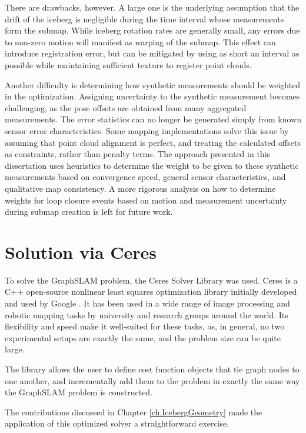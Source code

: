 There are drawbacks, however. A large one is the underlying assumption that the drift of the iceberg is negligible during the time interval whose measurements form the submap. While iceberg rotation rates are generally small, any errors due to non-zero motion will manifest as warping of the submap. This effect can introduce registration error, but can be mitigated by using as short an interval as possible while maintaining sufficient texture to register point clouds.

Another difficulty is determining how synthetic measurements should be weighted in the optimization. Assigning uncertainty to the synthetic measurement becomes challenging, as the pose offsets are obtained from many aggregated measurements. The error statistics can no longer be generated simply from known sensor error characteristics. Some mapping implementations solve this issue by assuming that point cloud alignment is perfect, and treating the calculated offsets as constraints, rather than penalty terms. The approach presented in this dissertation uses heuristics to determine the weight to be given to these synthetic measurements based on convergence speed, general sensor characteristics, and qualitative map consistency. A more rigorous analysis on how to determine weights for loop closure events based on motion and measurement uncertainty during submap creation is left for future work.

\section{Solution via Ceres}

To solve the GraphSLAM problem, the Ceres Solver Library was used. Ceres is a C++ open-source nonlinear least squares optimization library initially developed and used by Google \cite{ceres-solver}. It has been used in a wide range of image processing and robotic mapping tasks by university and research groups around the world. Its flexibility and speed make it well-suited for these tasks, as, in general, no two experimental setups are exactly the same, and the problem size can be quite large.  

The library allows the user to define cost function objects that tie graph nodes to one another, and incrementally add them to the problem in exactly the same way the GraphSLAM problem is constructed. 

The contributions discussed in Chapter \ref{ch.IcebergGeometry} made the application of this optimized solver a straightforward exercise.

